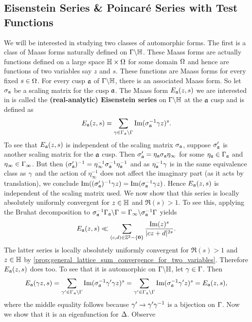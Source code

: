     \subsection*{Eisenstein Series \& Poincar\'e Series with Test Functions}
      We will be interested in studying two classes of automorphic forms. The first is a class of Maass forms naturally defined on $\Gamma\backslash\mathbb{H}$. These Maass forms are actually functions defined on a large space $\mathbb{H} \times \Omega$ for some domain $\Omega$ and hence are functions of two variables say $z$ and $s$. These functions are Maass forms for every fixed $s \in \Omega$. For every cusp $\mathfrak{a}$ of $\Gamma\backslash\mathbb{H}$, there is an associated Maass form. So let $\sigma_{\mathfrak{a}}$ be a scaling matrix for the cusp $\mathfrak{a}$. The Maass form $E_{\mathfrak{a}}(z,s)$ we are interested in is called the \textbf{(real-analytic) Eisenstein series} on $\Gamma\backslash\mathbb{H}$ at the $\mathfrak{a}$ cusp and is defined as
      \[
        E_{\mathfrak{a}}(z,s) = \sum_{\gamma \in \Gamma_{\mathfrak{a}}\backslash\Gamma}\mathrm{Im}(\sigma_{\mathfrak{a}}^{-1}\gamma z)^{s}.
      \]
      To see that $E_{\mathfrak{a}}(z,s)$ is independent of the scaling matrix $\sigma_{\mathfrak{a}}$, suppose $\sigma_{\mathfrak{a}}'$ is another scaling matrix for the $\mathfrak{a}$ cusp. Then $\sigma_{\mathfrak{a}}' = \eta_{\mathfrak{a}}\sigma_{\mathfrak{a}}\eta_{\infty}$ for some $\eta_{\mathfrak{a}} \in \Gamma_{\mathfrak{a}}$ and $\eta_{\infty} \in \Gamma_{\infty}$. But then $(\sigma_{\mathfrak{a}}')^{-1} = \eta_{\infty}^{-1}\sigma_{\mathfrak{a}}^{-1}\eta_{\mathfrak{a}}^{-1}$ and as $\eta_{\mathfrak{a}}^{-1}\gamma$ is in the same equivalence class as $\gamma$ and the action of $\eta_{\infty}^{-1}$ does not affect the imaginary part (as it acts by translation), we conclude $\mathrm{Im}((\sigma_{\mathfrak{a}}')^{-1}\gamma z) = \mathrm{Im}(\sigma_{\mathfrak{a}}^{-1}\gamma z)$. Hence $E_{\mathfrak{a}}(z,s)$ is independent of the scaling matrix used. We now show that this series is locally absolutely uniformly convergent for $z \in \mathbb{H}$ and $\Re(s) > 1$. To see this, applying the Bruhat decomposition to $\sigma_{\mathfrak{a}}^{-1}\Gamma_{\mathfrak{a}}\backslash\Gamma = \Gamma_{\infty}\backslash\sigma_{\mathfrak{a}}^{-1}\Gamma$ yields
      \[
        E_{\mathfrak{a}}(z,s) \ll \sum_{(c,d) \in \mathbb{Z}^{2}-\{\mathbf{0}\}}\frac{\mathrm{Im}(z)^{s}}{|cz+d|^{2s}}.
      \]
      The latter series is locally absolutely uniformly convergent for $\Re(s) > 1$ and $z \in \mathbb{H}$ by \cref{prop:general_lattice_sum_convergence_for_two_variables}. Therefore $E_{\mathfrak{a}}(z,s)$ does too. To see that it is automorphic on $\Gamma\backslash\mathbb{H}$, let $\gamma \in \Gamma$. Then
      \[
        E_{\mathfrak{a}}(\gamma z,s) = \sum_{\gamma' \in \Gamma_{\mathfrak{a}}\backslash\Gamma}\mathrm{Im}(\sigma_{\mathfrak{a}}^{-1}\gamma'\gamma z)^{s} = \sum_{\gamma' \in \Gamma_{\mathfrak{a}}\backslash\Gamma}\mathrm{Im}(\sigma_{\mathfrak{a}}^{-1}\gamma'z)^{s} = E_{\mathfrak{a}}(z,s),
      \]
      where the middle equality follows because $\gamma' \to \gamma'\gamma^{-1}$ is a bijection on $\Gamma$. Now we show that it is an eigenfunction for $\Delta$. Observe
